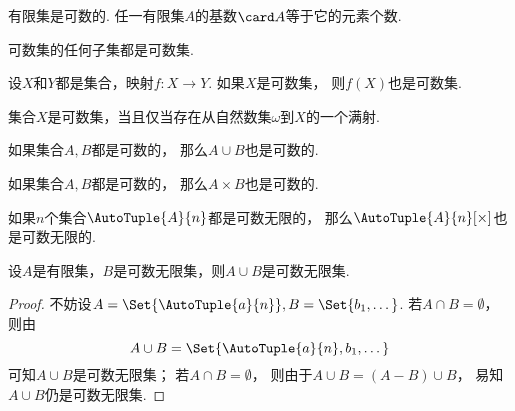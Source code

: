 \begin{proposition}
有限集是可数的.
任一有限集\(A\)的基数\(\card A\)等于它的元素个数.
\end{proposition}

\begin{proposition}
可数集的任何子集都是可数集.
\end{proposition}

\begin{proposition}
设\(X\)和\(Y\)都是集合，映射\(f\colon X\to Y\).
如果\(X\)是可数集，
则\(f(X)\)也是可数集.
\end{proposition}

\begin{proposition}
集合\(X\)是可数集，当且仅当存在从自然数集\(\omega\)到\(X\)的一个满射.
\end{proposition}

\begin{proposition}
如果集合\(A,B\)都是可数的，
那么\(A \cup B\)也是可数的.
\end{proposition}

\begin{proposition}
如果集合\(A,B\)都是可数的，
那么\(A \times B\)也是可数的.
\end{proposition}

\begin{proposition}
如果\(n\)个集合\(\AutoTuple{A}{n}\)都是可数无限的，
那么\(\AutoTuple{A}{n}[\times]\)也是可数无限的.
\end{proposition}

\begin{example}
设\(A\)是有限集，\(B\)是可数无限集，则\(A \cup B\)是可数无限集.
\begin{proof}
不妨设\(A = \Set{\AutoTuple{a}{n}},
B = \Set{b_1,\dotsc}\).
若\(A \cap B = \emptyset\)，
则由\begin{equation*}
	A \cup B = \Set{\AutoTuple{a}{n},b_1,\dotsc}
\end{equation*}
可知\(A \cup B\)是可数无限集；
若\(A \cap B = \emptyset\)，
则由于\(A \cup B = (A-B) \cup B\)，
易知\(A \cup B\)仍是可数无限集.
\end{proof}
\end{example}

